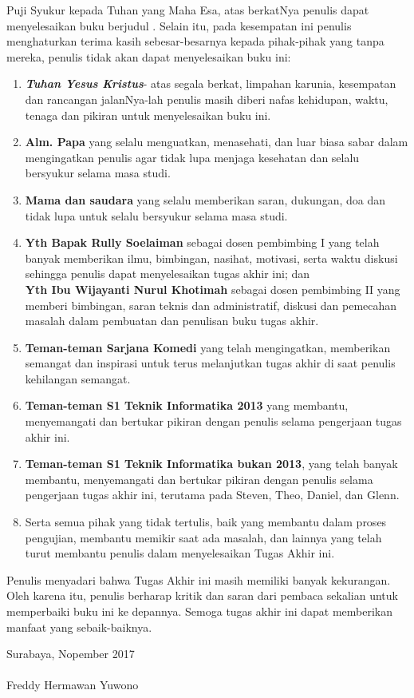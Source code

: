     
	  Puji Syukur kepada Tuhan yang Maha Esa, atas berkatNya penulis dapat menyelesaikan buku berjudul \textbf{\judul}. 
	  \newline
	  \indent Selain itu, pada kesempatan ini penulis menghaturkan terima kasih sebesar-besarnya kepada pihak-pihak yang tanpa mereka, penulis tidak akan dapat menyelesaikan buku ini:
  \begin{enumerate}
  	\item \textbf{\textit{Tuhan Yesus Kristus}}- atas segala berkat, limpahan karunia, kesempatan dan rancangan jalanNya-lah penulis masih diberi nafas kehidupan, waktu, tenaga dan pikiran untuk menyelesaikan buku ini.
    \item \textbf{Alm. Papa} yang selalu menguatkan, menasehati, dan luar biasa sabar dalam mengingatkan penulis agar tidak lupa menjaga kesehatan dan selalu bersyukur selama masa studi.
    \item \textbf{Mama dan saudara} yang selalu memberikan saran, dukungan, doa dan tidak lupa untuk selalu bersyukur selama masa studi.
    \item \textbf{Yth Bapak Rully Soelaiman} sebagai dosen pembimbing I yang telah banyak memberikan ilmu, bimbingan, nasihat, motivasi, serta waktu diskusi sehingga penulis dapat menyelesaikan tugas akhir ini; dan \\
	    \textbf{Yth Ibu Wijayanti Nurul Khotimah} sebagai dosen pembimbing II yang memberi bimbingan, saran teknis dan administratif, diskusi dan pemecahan masalah dalam pembuatan dan penulisan buku tugas akhir.
    \item \textbf{Teman-teman Sarjana Komedi} yang telah mengingatkan, memberikan semangat dan inspirasi untuk terus melanjutkan tugas akhir di saat penulis kehilangan semangat.
    \item \textbf{Teman-teman S1 Teknik Informatika 2013} yang membantu, menyemangati dan bertukar pikiran dengan  penulis selama pengerjaan tugas akhir ini.
    \item \textbf{Teman-teman S1 Teknik Informatika bukan 2013}, yang telah banyak membantu, menyemangati dan bertukar pikiran dengan penulis selama pengerjaan tugas akhir ini, terutama pada Steven, Theo, Daniel, dan Glenn.
    \item Serta semua pihak yang tidak tertulis, baik yang membantu dalam proses pengujian, membantu memikir saat ada masalah, dan lainnya yang telah turut membantu penulis dalam menyelesaikan Tugas Akhir ini.
  \end{enumerate}
  
  \indent Penulis menyadari bahwa Tugas Akhir ini masih memiliki banyak kekurangan. Oleh karena itu, penulis berharap kritik dan saran dari pembaca sekalian untuk memperbaiki buku ini ke depannya. Semoga tugas akhir ini dapat memberikan manfaat yang sebaik-baiknya.

  \hfill Surabaya, Nopember 2017 \\ \\ 


  \hfill Freddy Hermawan Yuwono

\cleardoublepage %

